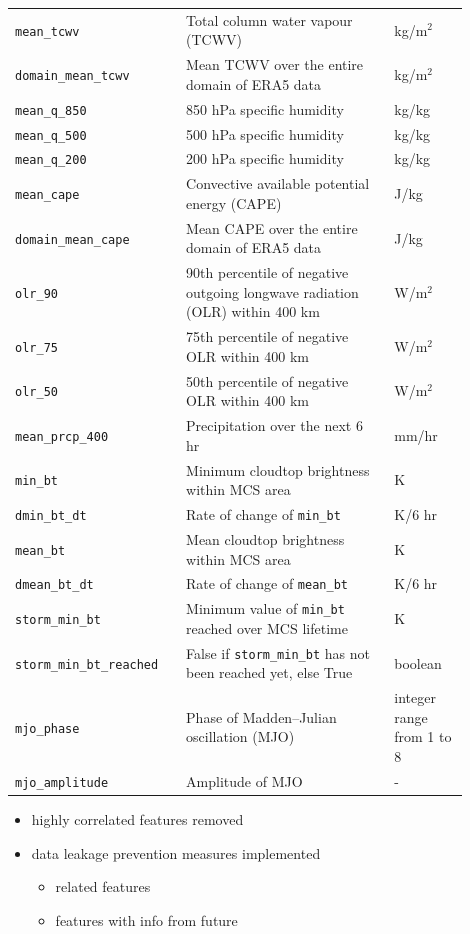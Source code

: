 {\begin{longtable}{>{\raggedright\arraybackslash}p{0.33\linewidth} p{0.42\linewidth} >{\raggedright\arraybackslash}p{0.15\linewidth}}
    \texttt{mean\_tcwv} & Total column water vapour (TCWV) & kg/m$^2$ \\
    \texttt{domain\_mean\_tcwv} & Mean TCWV over the entire domain of ERA5 data & kg/m$^2$ \\
    \texttt{mean\_q\_850} & 850 hPa specific humidity & kg/kg \\
    \texttt{mean\_q\_500} & 500 hPa specific humidity & kg/kg \\
    \texttt{mean\_q\_200} & 200 hPa specific humidity & kg/kg \\
    \texttt{mean\_cape} & Convective available potential energy (CAPE) & J/kg \\
    \texttt{domain\_mean\_cape} & Mean CAPE over the entire domain of ERA5 data & J/kg \\
    \texttt{olr\_90} & 90th percentile of negative outgoing longwave radiation (OLR) within 400 km & W/m$^2$ \\
    \texttt{olr\_75} & 75th percentile of negative OLR within 400 km & W/m$^2$ \\
    \texttt{olr\_50} & 50th percentile of negative OLR within 400 km & W/m$^2$ \\
    \texttt{mean\_prcp\_400} & Precipitation over the next 6 hr & mm/hr \\
    \texttt{min\_bt} & Minimum cloudtop brightness within MCS area & K \\
    \texttt{dmin\_bt\_dt} & Rate of change of \texttt{min\_bt} & K/6 hr \\
    \texttt{mean\_bt} & Mean cloudtop brightness within MCS area & K \\
    \texttt{dmean\_bt\_dt} & Rate of change of \texttt{mean\_bt} & K/6 hr \\
    \texttt{storm\_min\_bt} & Minimum value of \texttt{min\_bt} reached over MCS lifetime & K \\
    \texttt{storm\_min\_bt\_reached} & False if \texttt{storm\_min\_bt} has not been reached yet, else True & boolean \\
    \texttt{mjo\_phase} & Phase of Madden--Julian oscillation (MJO) & integer range from 1 to 8 \\
    \texttt{mjo\_amplitude} & Amplitude of MJO & - \\
\end{longtable}
}

\begin{itemize}
    \item highly correlated features removed
    \item data leakage prevention measures implemented
    \begin{itemize}
        \item related features
        \item features with info from future
    \end{itemize}
\end{itemize}

